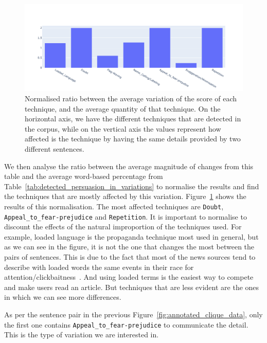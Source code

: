 \begin{figure}[!htbp]
    \centering
    \includegraphics[width=\linewidth]{figures/4.3.1_normalised_ratio_scores.pdf}
    \caption{Normalised ratio between the average variation of the score of each technique, and the average quantity of that technique. On the horizontal axis, we have the different techniques that are detected in the corpus, while on the vertical axis the values represent how affected is the technique by having the same details provided by two different sentences.}
    \label{fig:normalised_ratio_scores_persuasion}
\end{figure}

We then analyse the ratio between the average magnitude of changes from this table and the average word-based percentage from Table~\ref{tab:detected_persuasion_in_variations} to normalise the results and find the techniques that are mostly affected by this variation.
Figure~\ref{fig:normalised_ratio_scores_persuasion} shows the results of this normalisation. The most affected techniques are \texttt{Doubt}, \texttt{Appeal\_to\_fear-prejudice} and \texttt{Repetition}.
It is important to normalise to discount the effects of the natural improportion of the techniques used. For example, loaded language is the propaganda technique most used in general, but as we can see in the figure, it is not the one that changes the most between the pairs of sentences. This is due to the fact that most of the news sources tend to describe with loaded words the same events in their race for attention/clickbaitness~\citep{bazaco2019clickbait,davenport2001attention}. And using loaded terms is the easiest way to compete and make users read an article. But techniques that are less evident are the ones in which we can see more differences.


As per the sentence pair in the previous Figure~\ref{fig:annotated_clique_data}, only the first one contains \texttt{Appeal\_to\_fear-prejudice} to communicate the detail. This is the type of variation we are interested in.


